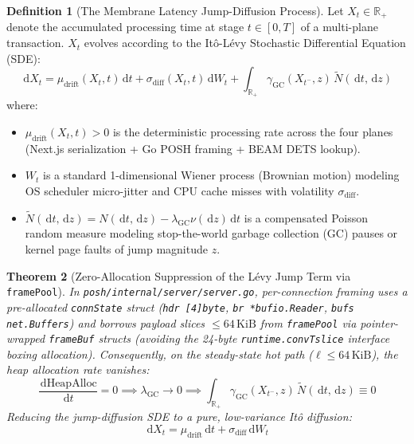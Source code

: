 \documentclass[10pt,twoside,openany]{book}
\theoremstyle{plain}
\newtheorem{theorem}{Theorem}[chapter]
\theoremstyle{definition}
\newtheorem{definition}[theorem]{Definition}
\theoremstyle{remark}
\newcommand{\R}{\mathbb{R}}
\newcommand{\dd}{\,\mathrm{d}}
\begin{document}
\begin{definition}[The Membrane Latency Jump-Diffusion Process]
Let $X_t \in \R_+$ denote the accumulated processing time at stage $t \in [0, T]$ of a multi-plane transaction. $X_t$ evolves according to the It\^o-L\'evy Stochastic Differential Equation (SDE):
\begin{equation}
\dd X_t = \mu_{\mathrm{drift}}(X_t, t)\dd t + \sigma_{\mathrm{diff}}(X_t, t)\dd W_t + \int_{\R_+} \gamma_{\mathrm{GC}}(X_{t^-}, z)\,\tilde{N}(\dd t, \dd z)
\end{equation}
where:
\begin{itemize}
    \item $\mu_{\mathrm{drift}}(X_t, t) > 0$ is the deterministic processing rate across the four planes (Next.js serialization + Go POSH framing + BEAM DETS lookup).
    \item $W_t$ is a standard 1-dimensional Wiener process (Brownian motion) modeling OS scheduler micro-jitter and CPU cache misses with volatility $\sigma_{\mathrm{diff}}$.
    \item $\tilde{N}(\dd t, \dd z) = N(\dd t, \dd z) - \lambda_{\mathrm{GC}}\nu(\dd z)\dd t$ is a compensated Poisson random measure modeling stop-the-world garbage collection (GC) pauses or kernel page faults of jump magnitude $z$.
\end{itemize}
\end{definition}

\begin{theorem}[Zero-Allocation Suppression of the L\'evy Jump Term via \texttt{framePool}]
In \texttt{posh/internal/server/server.go}, per-connection framing uses a pre-allocated \texttt{connState} struct (\texttt{hdr [4]byte}, \texttt{br *bufio.Reader}, \texttt{bufs net.Buffers}) and borrows payload slices $\le 64\,\mathrm{KiB}$ from \texttt{framePool} via pointer-wrapped \texttt{frameBuf} structs (avoiding the 24-byte \texttt{runtime.convTslice} interface boxing allocation). Consequently, on the steady-state hot path ($\ell \le 64\,\mathrm{KiB}$), the heap allocation rate vanishes:
\begin{equation}
\frac{\dd \mathrm{HeapAlloc}}{\dd t} = 0 \implies \lambda_{\mathrm{GC}} \to 0 \implies \int_{\R_+} \gamma_{\mathrm{GC}}(X_{t^-}, z)\,\tilde{N}(\dd t, \dd z) \equiv 0
\end{equation}
Reducing the jump-diffusion SDE to a pure, low-variance It\^o diffusion:
\begin{equation}
\dd X_t = \mu_{\mathrm{drift}}\dd t + \sigma_{\mathrm{diff}}\dd W_t
\end{equation}
\end{theorem}
\end{document}

